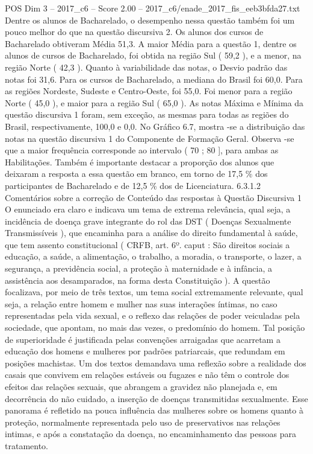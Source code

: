 \begin{textsample}{POS Dim 3 – 2017\_c6 – Score 2.00 – 2017\_c6/enade\_2017\_fis\_eeb3bfda27.txt}
Dentre os alunos de Bacharelado, o desempenho nessa questão também foi um pouco melhor do que na questão discursiva 2.
Os alunos dos cursos de Bacharelado obtiveram Média 51,3.
A maior Média para a questão 1, dentre os alunos de cursos de Bacharelado, foi obtida na região Sul ( 59,2 ), e a menor, na região Norte ( 42,3 ).
Quanto à variabilidade das notas, o Desvio padrão das notas foi 31,6.
Para os cursos de Bacharelado, a mediana do Brasil foi 60,0.
Para as regiões Nordeste, Sudeste e Centro-Oeste, foi 55,0.
Foi menor para a região Norte ( 45,0 ), e maior para a região Sul ( 65,0 ).
As notas Máxima e Mínima da questão discursiva 1 foram, sem exceção, as mesmas para todas as regiões do Brasil, respectivamente, 100,0 e 0,0.
No Gráfico 6.7, mostra -se a distribuição das notas na questão discursiva 1 do Componente de Formação Geral.
Observa -se que a maior frequência corresponde ao intervalo ( 70 ; 80 ], para ambas as Habilitações.
Também é importante destacar a proporção dos alunos que deixaram a resposta a essa questão em branco, em torno de 17,5 \% dos participantes de Bacharelado e de 12,5 \% dos de Licenciatura. 6.3.1.2 Comentários sobre a correção de Conteúdo das respostas à Questão Discursiva 1 O enunciado era claro e indicava um tema de extrema relevância, qual seja, a incidência de doença grave integrante do rol das DST ( Doenças Sexualmente Transmissíveis ), que encaminha para a análise do direito fundamental à saúde, que tem assento constitucional ( CRFB, art. 6º. caput : São direitos sociais a educação, a saúde, a alimentação, o trabalho, a moradia, o transporte, o lazer, a segurança, a previdência social, a proteção à maternidade e à infância, a assistência aos desamparados, na forma desta Constituição ).
A questão focalizava, por meio de três textos, um tema social extremamente relevante, qual seja, a relação entre homem e mulher nas suas interações íntimas, no caso representadas pela vida sexual, e o reflexo das relações de poder veiculadas pela sociedade, que apontam, no mais das vezes, o predomínio do homem.
Tal posição de superioridade é justificada pelas convenções arraigadas que acarretam a educação dos homens e mulheres por padrões patriarcais, que redundam em posições machistas.
Um dos textos demandava uma reflexão sobre a realidade dos casais que convivem em relações estáveis ou fugazes e não têm o controle dos efeitos das relações sexuais, que abrangem a gravidez não planejada e, em decorrência do não cuidado, a inserção de doenças transmitidas sexualmente.
Esse panorama é refletido na pouca influência das mulheres sobre os homens quanto à proteção, normalmente representada pelo uso de preservativos nas relações intimas, e após a constatação da doença, no encaminhamento das pessoas para tratamento.

\end{textsample}

